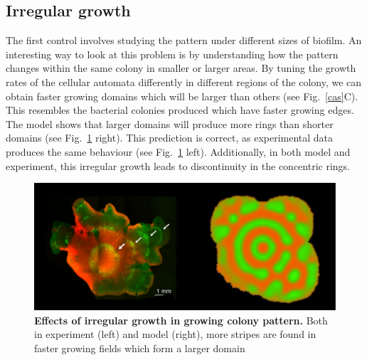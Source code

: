 \subsection{Irregular growth}
The first control involves studying the pattern under different sizes of biofilm.
An interesting way to look at this problem is by understanding how the pattern changes within the same colony in smaller or larger areas.
By tuning the growth rates of the cellular automata differently in different regions of the colony, we can obtain faster growing domains which will be larger than others (see Fig.~\ref{cas}C).
This resembles the bacterial colonies produced which have faster growing edges.
The model shows that larger domains will produce more rings than shorter domains (see Fig.~\ref{fig:irregular growth} right).
This prediction is correct, as experimental data produces the same behaviour  (see Fig.~\ref{fig:irregular growth} left).
Additionally, in both model and experiment, this irregular growth leads to discontinuity in the concentric rings.
\begin{figure}[H] %
    \centering
    \begin{adjustbox}{center}
        \includegraphics[width=1\textwidth]{chapters/Chapter 3/irregular growth} %
    \end{adjustbox}
    \caption{\textbf{Effects of irregular growth in growing colony pattern.} Both in experiment (left) and model (right), more stripes are found in faster growing fields which form a larger domain}
    \label{fig:irregular growth}
\end{figure}


